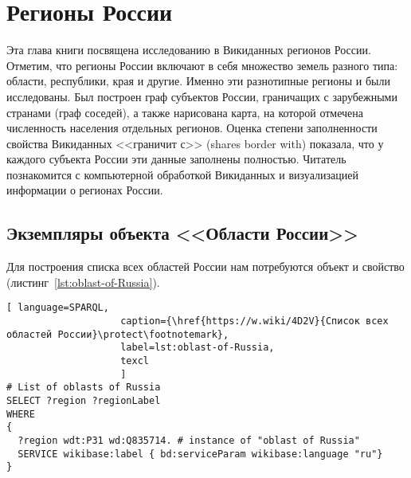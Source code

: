 ﻿\chapter{Регионы России}
\label{ch:oblast-of-Russia}
Эта глава книги посвящена исследованию в Викиданных регионов России. 
Отметим, что регионы России включают в себя множество земель разного 
типа: области, республики, края и другие. Именно эти разнотипные регионы 
и были исследованы. Был построен граф субъектов России, граничащих 
с зарубежными странами (граф соседей), а также нарисована карта, 
на которой отмечена численность населения отдельных регионов. Оценка 
степени заполненности свойства Викиданных <<граничит с>> (shares border with) 
показала, что у каждого субъекта России эти данные заполнены полностью. 
Читатель познакомится с компьютерной обработкой Викиданных и визуализацией 
информации о регионах России.

\label{question:q_subjects_of_Russia_3}

\section{Экземпляры объекта <<Области России>>}

Для построения списка всех областей России нам потребуются объект 
 и свойство  
(листинг~\protect\ref{lst:oblast-of-Russia}).

\begin{lstlisting}[ language=SPARQL, 
                    caption={\href{https://w.wiki/4D2V}{Список всех областей России}\protect\footnotemark},
                    label=lst:oblast-of-Russia,
                    texcl 
                    ]
# List of oblasts of Russia
SELECT ?region ?regionLabel
WHERE
{
  ?region wdt:P31 wd:Q835714. # instance of "oblast of Russia"
  SERVICE wikibase:label { bd:serviceParam wikibase:language "ru"}
}
\end{lstlisting}%

